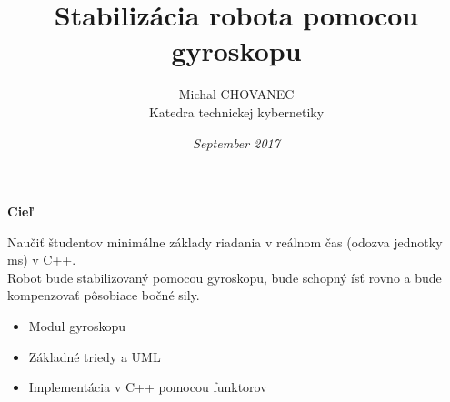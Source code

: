 \documentclass[xcolor=dvipsnames]{beamer}
\title{\bf Stabilizácia robota pomocou gyroskopu}
\author{Michal CHOVANEC \\ Katedra technickej kybernetiky}
\date[EURP]{\it September 2017}
\begin{document}
\begin{frame}
\titlepage
\end{frame}



\begin{frame}{\bf Cieľ}

  Naučiť študentov minimálne základy riadania v reálnom čas (odozva jednotky ms) v C++.\\
  Robot bude stabilizovaný pomocou gyroskopu, bude schopný ísť rovno a bude kompenzovať
  pôsobiace bočné sily.

    \begin{itemize}
      \item Modul gyroskopu
      \item Základné triedy a UML
      \item Implementácia v C++ pomocou funktorov
    \end{itemize}

\end{frame}
\end{document}
